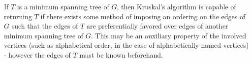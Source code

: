 If $ T $ is a minimum spanning tree of $ G $, then Kruskal's algorithm is capable of returning $ T $ if there exists some method of imposing an ordering on the edges of $ G $ such that the edges of $ T $ are preferentially favored over edges of another minimum spanning tree of $ G $. This may be an auxiliary property of the involved vertices (such as alphabetical order, in the case of alphabetically-named vertices) - however the edges of $ T $ must be known beforehand.